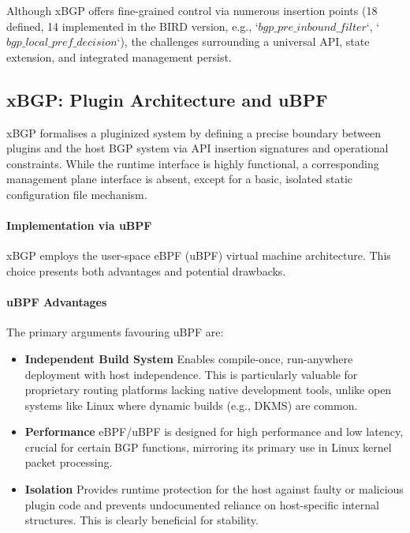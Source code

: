 Although xBGP offers fine-grained control via numerous insertion points (18 defined, 14 implemented in the BIRD version, e.g., `$bgp\_pre\_inbound\_filter$`, `$bgp\_local\_pref\_decision$`), the challenges surrounding a universal API, state extension, and integrated management persist.

\subsection{xBGP: Plugin Architecture and uBPF}

xBGP formalises a pluginized system by defining a precise boundary between plugins and the host BGP system via API insertion signatures and operational constraints. While the runtime interface is highly functional, a corresponding management plane interface is absent, except for a basic, isolated static configuration file mechanism.

\paragraph{Implementation via uBPF}
xBGP employs the user-space eBPF (uBPF) virtual machine architecture. This choice presents both advantages and potential drawbacks.

\paragraph{uBPF Advantages}
The primary arguments favouring uBPF are:
\begin{itemize}
    \item \textbf{Independent Build System} Enables compile-once, run-anywhere deployment with host independence. This is particularly valuable for proprietary routing platforms lacking native development tools, unlike open systems like Linux where dynamic builds (e.g., DKMS) are common.
    \item \textbf{Performance} eBPF/uBPF is designed for high performance and low latency, crucial for certain BGP functions, mirroring its primary use in Linux kernel packet processing.
    \item \textbf{Isolation} Provides runtime protection for the host against faulty or malicious plugin code and prevents undocumented reliance on host-specific internal structures. This is clearly beneficial for stability.
\end{itemize}

